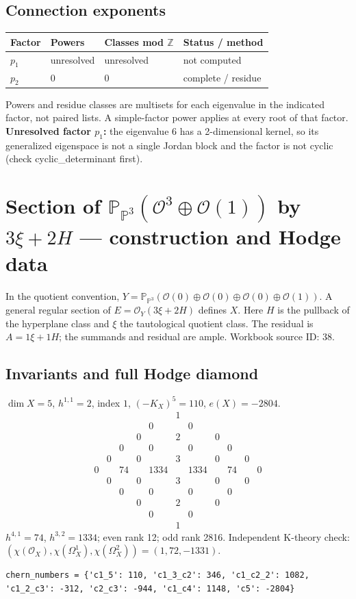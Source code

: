 \documentclass[10pt,a4paper]{article}
\begin{document}
\subsection*{Connection exponents}
\begin{center}\begin{tabular}{llll}\toprule Factor & Powers & Classes mod $\mathbb Z$ & Status / method\\\midrule
$p_{1}$ & unresolved & unresolved & not computed\\
$p_{2}$ & $0$ & $0$ & complete / residue\\
\bottomrule\end{tabular}\end{center}
Powers and residue classes are multisets for each eigenvalue in the indicated factor, not paired lists. A simple-factor power applies at every root of that factor.
\textbf{Unresolved factor $p_{1}$:} the eigenvalue 6 has a 2-dimensional kernel, so its generalized eigenspace is not a single Jordan block and the factor is not cyclic (check cyclic\_determinant first).
\clearpage\section*{Section of $\mathbb P_{\mathbb P^{3}}(\mathcal O^{3}\oplus \mathcal O(1))$ by $3\xi +2H$ --- construction and Hodge data}\label{entry:PB5-038}
In the quotient convention, $Y=\mathbb P_{\mathbb P^{3}}(\mathcal O(0)\oplus\mathcal O(0)\oplus\mathcal O(0)\oplus\mathcal O(1))$.
A general regular section of $E=\mathcal O_Y(3\xi+2H)$ defines $X$.
Here $H$ is the pullback of the hyperplane class and $\xi$ the tautological quotient class. The residual is $A=1\xi+1H$; the summands and residual are ample.
Workbook source ID: 38.
\subsection*{Invariants and full Hodge diamond}
$\dim X=5$, $h^{1,1}=2$, index $1$, $(-K_X)^5=110$, $e(X)=-2804$.
\[\begin{array}{ccccccccccc}&&&&&1&&&&&\\&&&&0&&0&&&&\\&&&0&&2&&0&&&\\&&0&&0&&0&&0&&\\&0&&0&&3&&0&&0&\\0&&74&&1334&&1334&&74&&0\\&0&&0&&3&&0&&0&\\&&0&&0&&0&&0&&\\&&&0&&2&&0&&&\\&&&&0&&0&&&&\\&&&&&1&&&&&\end{array}\]
$h^{4,1}=74$, $h^{3,2}=1334$; even rank 12; odd rank 2816.
Independent K-theory check: $(\chi(\mathcal O_X),\chi(\Omega_X^1),\chi(\Omega_X^2))=(1, 72, -1331)$.
\begin{lstlisting}
chern_numbers = {'c1_5': 110, 'c1_3_c2': 346, 'c1_c2_2': 1082, 'c1_2_c3': -312, 'c2_c3': -944, 'c1_c4': 1148, 'c5': -2804}
\end{lstlisting}
\end{document}
